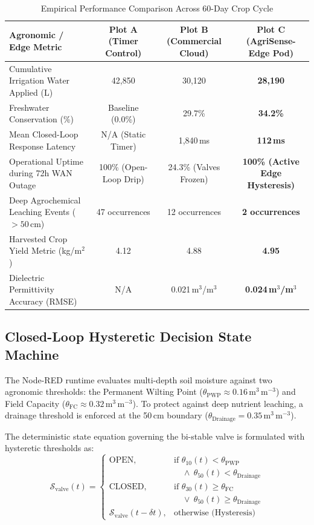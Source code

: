 \documentclass[journal,10pt,twocolumn]{IEEEtran}
\begin{document}
\begin{table}[t]
\caption{Empirical Performance Comparison Across 60-Day Crop Cycle}
\label{tab:results}
\centering
\begin{tabular*}{\textwidth}{@{\extracolsep{\fill}}lccc}
\toprule
\textbf{Agronomic / Edge Metric} & \textbf{Plot A (Timer Control)} & \textbf{Plot B (Commercial Cloud)} & \textbf{Plot C (AgriSense-Edge Pod)} \\
\midrule
Cumulative Irrigation Water Applied (L) & 42,850 & 30,120 & \textbf{28,190} \\
Freshwater Conservation (\%) & Baseline (0.0\%) & 29.7\% & \textbf{34.2\%} \\
Mean Closed-Loop Response Latency & N/A (Static Timer) & 1,840\,ms & \textbf{112\,ms} \\
Operational Uptime during 72h WAN Outage & 100\% (Open-Loop Drip) & 24.3\% (Valves Frozen) & \textbf{100\% (Active Edge Hysteresis)} \\
Deep Agrochemical Leaching Events ($>50$\,cm) & 47 occurrences & 12 occurrences & \textbf{2 occurrences} \\
Harvested Crop Yield Metric (kg/m$^2$) & 4.12 & 4.88 & \textbf{4.95} \\
Dielectric Permittivity Accuracy (RMSE) & N/A & 0.021\,m$^3$/m$^3$ & \textbf{0.024\,m$^3$/m$^3$} \\
\bottomrule
\end{tabular*}
\end{table}

\subsection{Closed-Loop Hysteretic Decision State Machine}
The Node-RED runtime evaluates multi-depth soil moisture against two agronomic thresholds: the Permanent Wilting Point ($\theta_{\text{PWP}} \approx 0.16$\,m$^3$\,m$^{-3}$) and Field Capacity ($\theta_{\text{FC}} \approx 0.32$\,m$^3$\,m$^{-3}$). To protect against deep nutrient leaching, a drainage threshold is enforced at the 50\,cm boundary ($\theta_{\text{Drainage}} = 0.35$\,m$^3$\,m$^{-3}$).

The deterministic state equation governing the bi-stable valve is formulated with hysteretic thresholds as:
\begin{equation}
\mathcal{S}_{\text{valve}}(t) = 
\begin{cases}
\text{OPEN}, & \text{if } \theta_{10}(t) < \theta_{\text{PWP}} \\
             & \quad \land\ \theta_{50}(t) < \theta_{\text{Drainage}} \\
\text{CLOSED}, & \text{if } \theta_{30}(t) \ge \theta_{\text{FC}} \\
               & \quad \lor\ \theta_{50}(t) \ge \theta_{\text{Drainage}} \\
\mathcal{S}_{\text{valve}}(t-\delta t), & \text{otherwise (Hysteresis)}
\end{cases}
\label{eq:state_machine}
\end{equation}
\end{document}
